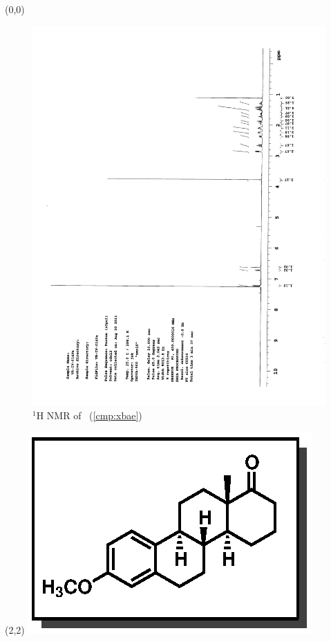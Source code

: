 \begin{textblock}{20}(0,0)
\begin{figure}[htb]
\caption{$^1$H NMR of \CMPxbae\ (\ref{cmp:xbae})}
\includegraphics[scale=0.75, trim = 0mm 0mm 0mm 5mm,
clip]{chp_singlecarbon/images/nmr/xbaeH}
\vspace{-100pt}
\end{figure}
\end{textblock}
\begin{textblock}{1}(2,2)
\includegraphics[scale=0.8, angle=90]{chp_singlecarbon/images/xbae}
\end{textblock}
